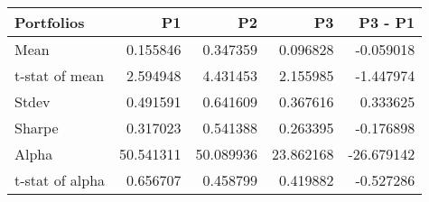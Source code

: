 \begin{tabular}{lrrrr}
\toprule
Portfolios & P1 & P2 & P3 & P3 - P1 \\
\midrule
Mean & 0.155846 & 0.347359 & 0.096828 & -0.059018 \\
t-stat of mean & 2.594948 & 4.431453 & 2.155985 & -1.447974 \\
Stdev & 0.491591 & 0.641609 & 0.367616 & 0.333625 \\
Sharpe & 0.317023 & 0.541388 & 0.263395 & -0.176898 \\
Alpha & 50.541311 & 50.089936 & 23.862168 & -26.679142 \\
t-stat of alpha & 0.656707 & 0.458799 & 0.419882 & -0.527286 \\
\bottomrule
\end{tabular}

